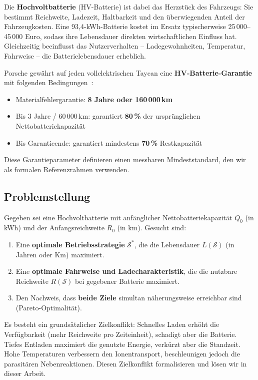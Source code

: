 ﻿\documentclass[a4paper,12pt]{article}
\theoremstyle{definition}
\begin{document}
Die \textbf{Hochvoltbatterie} (HV-Batterie) ist dabei das Herzst\"uck des
Fahrzeugs: Sie bestimmt Reichweite, Ladezeit, Haltbarkeit und den
\"uberwiegenden Anteil der Fahrzeugkosten. Eine 93,4-kWh-Batterie kostet
im Ersatz typischerweise 25\,000--45\,000 Euro, sodass ihre Lebensdauer
direkten wirtschaftlichen Einfluss hat. Gleichzeitig beeinflusst das
Nutzerverhalten -- Ladegewohnheiten, Temperatur, Fahrweise -- die
Batterielebensdauer erheblich.

Porsche gew\"ahrt auf jeden vollelektrischen Taycan eine
\textbf{HV-Batterie-Garantie} mit folgenden Bedingungen~\cite{Porsche2024}:
\begin{itemize}
  \item Materialfehlergarantie: \textbf{8 Jahre oder 160\,000\,km}
  \item Bis 3 Jahre / 60\,000\,km: garantiert \textbf{80\,\%} der urspr\"unglichen Nettobatteriekapazit\"at
  \item Bis Garantieende: garantiert mindestens \textbf{70\,\%} Restkapazit\"at
\end{itemize}
Diese Garantieparameter definieren einen messbaren Mindeststandard,
den wir als formalen Referenzrahmen verwenden.

\subsection{Problemstellung}

Gegeben sei eine Hochvoltbatterie mit anf\"anglicher Nettobatteriekapazit\"at
$Q_0$ (in kWh) und der Anfangsreichweite $R_0$ (in km). Gesucht sind:
\begin{enumerate}
  \item Eine \textbf{optimale Betriebsstrategie} $\mathcal{S}^*$, die die
    Lebensdauer $L(\mathcal{S})$ (in Jahren oder Km) maximiert.
  \item Eine \textbf{optimale Fahrweise und Ladecharakteristik},
    die die nutzbare Reichweite $R(\mathcal{S})$ bei gegebener Batterie maximiert.
  \item Den Nachweis, dass \textbf{beide Ziele} simultan n\"aherungsweise
    erreichbar sind (Pareto-Optimalit\"at).
\end{enumerate}

Es besteht ein grunds\"atzlicher Zielkonflikt: Schnelles Laden erh\"oht die
Verf\"ugbarkeit (mehr Reichweite pro Zeiteinheit), schadigt aber die Batterie.
Tiefes Entladen maximiert die genutzte Energie, verkürzt aber die Standzeit.
Hohe Temperaturen verbessern den Ionentransport, beschleunigen jedoch die
parasit\"aren Nebenreaktionen. Diesen Zielkonflikt formalisieren und l\"osen
wir in dieser Arbeit.
\end{document}
